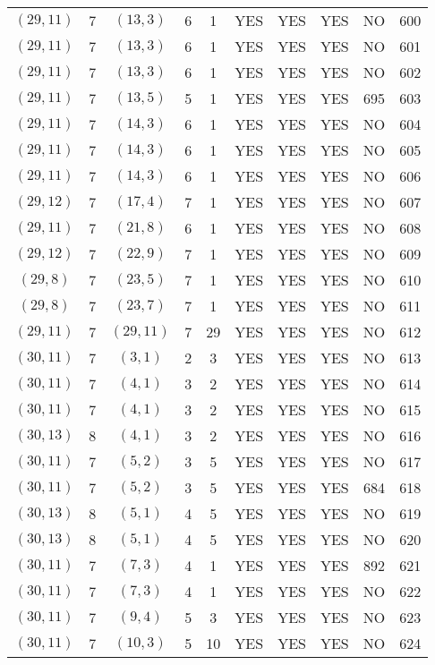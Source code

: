 \begin{longtable}{|c|c|c|c|c|c|c|c|c|c|}
$(29, 11)$ & 7 & $(13, 3)$ & 6 & 1 & YES & YES & YES & NO & 600\\
$(29, 11)$ & 7 & $(13, 3)$ & 6 & 1 & YES & YES & YES & NO & 601\\
$(29, 11)$ & 7 & $(13, 3)$ & 6 & 1 & YES & YES & YES & NO & 602\\
$(29, 11)$ & 7 & $(13, 5)$ & 5 & 1 & YES & YES & YES & 695 & 603\\
$(29, 11)$ & 7 & $(14, 3)$ & 6 & 1 & YES & YES & YES & NO & 604\\
$(29, 11)$ & 7 & $(14, 3)$ & 6 & 1 & YES & YES & YES & NO & 605\\
$(29, 11)$ & 7 & $(14, 3)$ & 6 & 1 & YES & YES & YES & NO & 606\\
$(29, 12)$ & 7 & $(17, 4)$ & 7 & 1 & YES & YES & YES & NO & 607\\
$(29, 11)$ & 7 & $(21, 8)$ & 6 & 1 & YES & YES & YES & NO & 608\\
$(29, 12)$ & 7 & $(22, 9)$ & 7 & 1 & YES & YES & YES & NO & 609\\
$(29, 8)$ & 7 & $(23, 5)$ & 7 & 1 & YES & YES & YES & NO & 610\\
$(29, 8)$ & 7 & $(23, 7)$ & 7 & 1 & YES & YES & YES & NO & 611\\
$(29, 11)$ & 7 & $(29, 11)$ & 7 & 29 & YES & YES & YES & NO & 612\\
$(30, 11)$ & 7 & $(3, 1)$ & 2 & 3 & YES & YES & YES & NO & 613\\
$(30, 11)$ & 7 & $(4, 1)$ & 3 & 2 & YES & YES & YES & NO & 614\\
$(30, 11)$ & 7 & $(4, 1)$ & 3 & 2 & YES & YES & YES & NO & 615\\
$(30, 13)$ & 8 & $(4, 1)$ & 3 & 2 & YES & YES & YES & NO & 616\\
$(30, 11)$ & 7 & $(5, 2)$ & 3 & 5 & YES & YES & YES & NO & 617\\
$(30, 11)$ & 7 & $(5, 2)$ & 3 & 5 & YES & YES & YES & 684 & 618\\
$(30, 13)$ & 8 & $(5, 1)$ & 4 & 5 & YES & YES & YES & NO & 619\\
$(30, 13)$ & 8 & $(5, 1)$ & 4 & 5 & YES & YES & YES & NO & 620\\
$(30, 11)$ & 7 & $(7, 3)$ & 4 & 1 & YES & YES & YES & 892 & 621\\
$(30, 11)$ & 7 & $(7, 3)$ & 4 & 1 & YES & YES & YES & NO & 622\\
$(30, 11)$ & 7 & $(9, 4)$ & 5 & 3 & YES & YES & YES & NO & 623\\
$(30, 11)$ & 7 & $(10, 3)$ & 5 & 10 & YES & YES & YES & NO & 624\\

\end{longtable}
